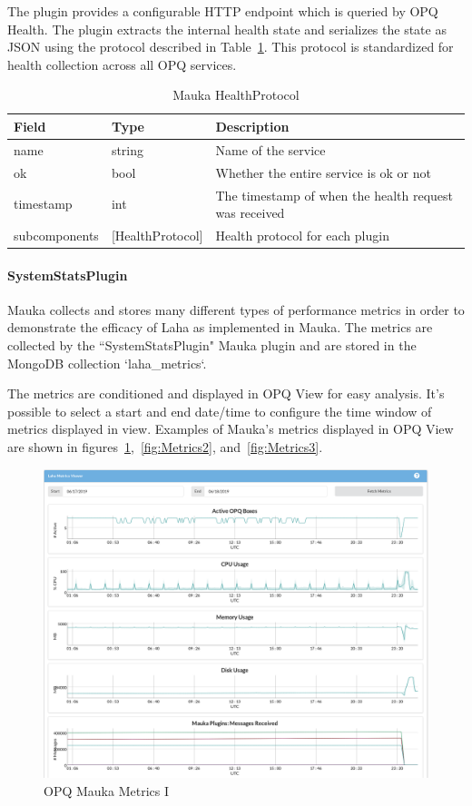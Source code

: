 The plugin provides a configurable HTTP endpoint which is queried by OPQ Health. The plugin extracts the internal health state and serializes the state as JSON using the protocol described in Table~\ref{table:HealthProtocol}. This protocol is standardized for health collection across all OPQ services.

\begin{table}[H]
	\centering
	\caption{Mauka HealthProtocol}
	\begin{tabularx}{\textwidth}{llX}
		\toprule
		\textbf{Field} & \textbf{Type} & \textbf{Description} \\
		\midrule
		name & string & Name of the service \\
		ok & bool & Whether the entire service is ok or not \\
		timestamp & int & The timestamp of when the health request was received \\
		subcomponents & [HealthProtocol] & Health protocol for each plugin \\
		\bottomrule
	\end{tabularx}
	\label{table:HealthProtocol}
\end{table}

\paragraph{SystemStatsPlugin}\label{lbl:SystemStatsPlugin}
Mauka collects and stores many different types of performance metrics in order to demonstrate the efficacy of Laha as implemented in Mauka. The metrics are collected by the ``SystemStatsPlugin" Mauka plugin and are stored in the MongoDB collection `laha\_metrics`.

The metrics are conditioned and displayed in OPQ View for easy analysis. It's possible to select a start and end date/time to configure the time window of metrics displayed in view. Examples of Mauka's metrics displayed in OPQ View are shown in figures~\ref{fig:Metrics1},~\ref{fig:Metrics2}, and~\ref{fig:Metrics3}.

\begin{figure}
	\centering
	\includegraphics[width=\linewidth]{figures/metrics_1.png}
	\caption{OPQ Mauka Metrics I}
	\label{fig:Metrics1}
\end{figure}

